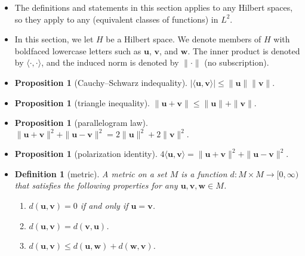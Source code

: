 \documentclass[10pt]{article}
\newtheorem{definition}[lemma]{Definition}
\newtheorem{proposition}[lemma]{Proposition}
\numberwithin{lemma}{section}
\newcommand{\ve}[1]{\mathbf{#1}}
\begin{document}
\begin{itemize}
  \item The definitions and statements in this section applies to any Hilbert spaces, so they apply to any (equivalent classes of functions) in $L^2$.
  
  \item In this section, we let $H$ be a Hilbert space. We denote members of $H$ with boldfaced lowercase letters such as $\ve{u}$, $\ve{v}$, and $\ve{w}$. The inner product is denoted by $\langle \cdot, \cdot \rangle$, and the induced norm is denoted by $\| \cdot \|$ (no subscription).
  
  \item \begin{proposition}[Cauchy--Schwarz indequality]
    $|\langle \ve{u}, \ve{v} \rangle| \leq \| \ve{u} \| \| \ve{v} \|.$
  \end{proposition}

  \item \begin{proposition}[triangle inequality]
    $\| \ve{u} + \ve{v} \| \leq \| \ve{u} \| + \| \ve{v} \|.$
  \end{proposition}

  \item \begin{proposition}[parallelogram law]
    $\| \ve{u} + \ve{v} \|^2 + \| \ve{u} - \ve{v} \|^2 = 2\| \ve{u} \|^2 + 2 \| \ve{v} \|^2. $ 
  \end{proposition}

  \item \begin{proposition}[polarization identity]
    $4\langle \ve{u}, \ve{v} \rangle = \| \ve{u} + \ve{v} \|^2 + \| \ve{u} - \ve{v} \|^2.$
  \end{proposition}

  \item \begin{definition}[metric]
    A metric on a set $M$ is a function $d: M \times M \rightarrow [0,\infty)$ that satisfies the following properties for any $\ve{u}, \ve{v}, \ve{w} \in M$.
    \begin{enumerate}
      \item $d(\ve{u}, \ve{v}) = 0$ if and only if $\ve{u} = \ve{v}$.
      \item $d(\ve{u}, \ve{v}) = d(\ve{v}, \ve{u})$.
      \item $d(\ve{u}, \ve{v}) \leq d(\ve{u}, \ve{w}) + d(\ve{w}, \ve{v})$.
    \end{enumerate}
  \end{definition}


\end{itemize}
\end{document}
